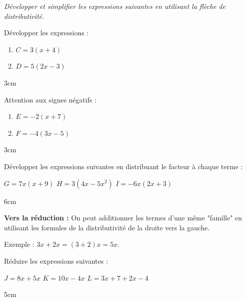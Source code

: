 \documentclass[a4paper]{book}
\begin{document}
    \textit{Développer et simplifier les expressions suivantes en utilisant la flèche de distributivité.}
    
    \begin{minipage}[t]{0.48\textwidth}
        \begin{exercice}
            Développer les expressions :
            \begin{enumerate} [label=\alph*)]
                \item $C = 3(x + 4)$
                \item $D = 5(2x - 3)$
            \end{enumerate}
            \begin{ZoneReponse}{3cm}
            \end{ZoneReponse}
        \end{exercice}
    \end{minipage}
    \hfill
    \begin{minipage}[t]{0.48\textwidth}
        \begin{exercice}
            Attention aux signes négatifs :
            \begin{enumerate} [label=\alph*)]
                \item $E = -2(x + 7)$
                \item $F = -4(3x - 5)$
            \end{enumerate}
            \begin{ZoneReponse}{3cm}
            \end{ZoneReponse}
        \end{exercice}
    \end{minipage}


    \begin{minipage}[t]{0.48\textwidth}
        \begin{exercice}
            Développer les expressions suivantes en distribuant le facteur à chaque terme :
            
            $G = 7x(x + 9)$ \; $H = 3(4x - 5x^2)$ \;  $I = -6x(2x + 3)$
            \begin{ZoneReponse}{6cm}
            \end{ZoneReponse}
        \end{exercice}
    \end{minipage}
    \hfill
    \begin{minipage}[t]{0.48\textwidth}
        \begin{exercice}
            \textbf{Vers la réduction :} On peut additionner les termes d'une même "famille" en utilisant les formules de la distributivité de la droite vers la gauche. 
            
            Exemple : $3x + 2x = (3+2)x = 5x$.
            
            Réduire les expressions suivantes :
            
            $J = 8x + 5x$ \; $K = 10x - 4x$ \; $L = 3x + 7 + 2x - 4$
            \begin{ZoneReponse}{5cm}
            \end{ZoneReponse}
        \end{exercice}
    \end{minipage}
    
\end{document}
